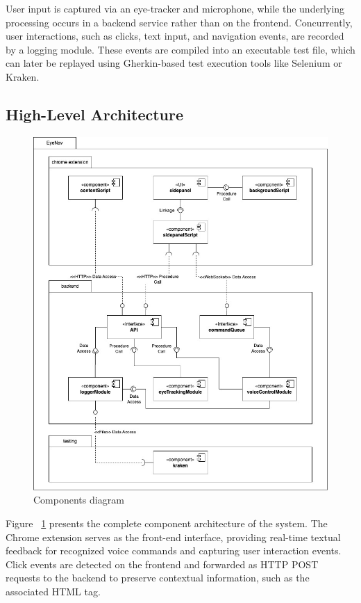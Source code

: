 User input is captured via an eye-tracker and microphone, while the underlying processing occurs in a backend service rather than on the frontend. Concurrently, user interactions, such as clicks, text input, and navigation events, are recorded by a logging module. These events are compiled into an executable test file, which can later be replayed using Gherkin-based test execution tools like Selenium or Kraken\cite{ravelo2023kraken}.


\subsection{High-Level Architecture}

\begin{figure}
    \centering
    \includegraphics[width=0.8\linewidth]{imgs/components-diagram.jpg}
    \caption{Components diagram}
    \vspace{-13pt}
    \label{fig:components-diagram}
\end{figure}

Figure ~\ref{fig:components-diagram} presents the complete component architecture of the system. The Chrome extension serves as the front-end interface, providing real-time textual feedback for recognized voice commands and capturing user interaction events. Click events are detected on the frontend and forwarded as HTTP POST requests to the backend to preserve contextual information, such as the associated HTML tag. 

